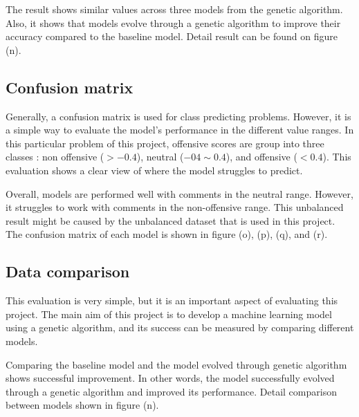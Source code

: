 \documentclass[11pt, natbib=false]{article}
\begin{document}
The result shows similar values across three models from the genetic algorithm.
Also, it shows that models evolve through a genetic algorithm to improve their accuracy compared to the baseline model.
Detail result can be found on figure (n).

\subsection{Confusion matrix}
Generally, a confusion matrix is used for class predicting problems.
However, it is a simple way to evaluate the model’s performance in the different value ranges.
In this particular problem of this project, offensive scores are group into three classes : non offensive ($ > -0.4 $), neutral ($ -04 \sim 0.4 $), and offensive ($ < 0.4 $).
This evaluation shows a clear view of where the model struggles to predict.

Overall, models are performed well with comments in the neutral range.
However, it struggles to work with comments in the non-offensive range.
This unbalanced result might be caused by the unbalanced dataset that is used in this project.
The confusion matrix of each model is shown in figure (o), (p), (q), and (r).

\subsection{Data comparison}
This evaluation is very simple, but it is an important aspect of evaluating this project.
The main aim of this project is to develop a machine learning model using a genetic algorithm, and its success can be measured by comparing different models.

Comparing the baseline model and the model evolved through genetic algorithm shows successful improvement.
In other words, the model successfully evolved through a genetic algorithm and improved its performance.
Detail comparison between models shown in figure (n).
\end{document}
